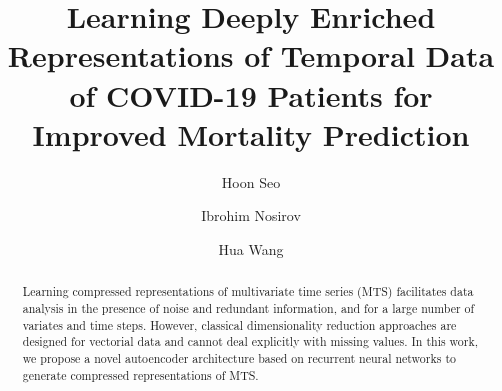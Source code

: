 \documentclass[runningheads]{llncs}
\begin{document}
%
\title{Learning Deeply Enriched Representations of Temporal Data of COVID-19 Patients for Improved Mortality Prediction}
%
%
\author{Hoon Seo \and
Ibrohim Nosirov \and
Hua Wang}
%
%
%
\maketitle              %
%
\begin{abstract}
\iffalse
Learning compressed representations of multivariate time series (MTS) facilitates data analysis in the presence of noise and redundant information, and for a large number of variates and time steps. However, classical dimensionality reduction approaches are designed for vectorial data and cannot deal explicitly with missing values. In this work, we propose a novel autoencoder architecture based on recurrent neural networks to generate compressed representations of MTS.


\end{abstract}
\end{document}
